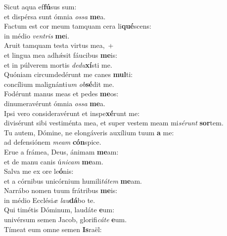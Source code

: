 \evenverse Sicut aqua ef\textbf{fú}sus sum:~\*\\
\evenverse et dispérsa sunt ómnia \textit{os}\textit{sa} \textbf{me}a.\\
\oddverse Factum est cor meum tamquam cera li\textbf{qué}scens:~\*\\
\oddverse in médio \textit{ven}\textit{tris} \textbf{me}i.\\
\evenverse Aruit tamquam testa virtus mea,~+\\
\evenverse  et lingua mea adhǽsit fáucibus \textbf{me}is:~\*\\
\evenverse et in púlverem mortis \textit{de}\textit{du}\textbf{xí}sti me.\\
\oddverse Quóniam circumdedérunt me canes \textbf{mul}ti:~\*\\
\oddverse concílium malignánti\textit{um} \textit{ob}\textbf{sé}dit me.\\
\evenverse Fodérunt manus meas et pedes \textbf{me}os:~\*\\
\evenverse dinumeravérunt ómnia \textit{os}\textit{sa} \textbf{me}a.\\
\oddverse Ipsi vero consideravérunt et inspe\textbf{xé}runt me:~\*\\
\oddverse divisérunt sibi vestiménta mea, et super vestem meam mi\textit{sé}\textit{runt} \textbf{sor}tem.\\
\evenverse Tu autem, Dómine, ne elongáveris auxílium tuum \textbf{a} me:~\*\\
\evenverse ad defensiónem \textit{me}\textit{am} \textbf{cón}spice.\\
\oddverse Erue a frámea, Deus, ánimam \textbf{me}am:~\*\\
\oddverse et de manu canis ú\textit{ni}\textit{cam} \textbf{me}am.\\
\evenverse Salva me ex ore le\textbf{ó}nis:~\*\\
\evenverse et a córnibus unicórnium humili\textit{tá}\textit{tem} \textbf{me}am.\\
\oddverse Narrábo nomen tuum frátribus \textbf{me}is:~\*\\
\oddverse in médio Ecclési\textit{æ} \textit{lau}\textbf{dá}bo te.\\
\evenverse Qui timétis Dóminum, laudáte \textbf{e}um:~\*\\
\evenverse univérsum semen Jacob, glorifi\textit{cá}\textit{te} \textbf{e}um.\\
\oddverse Tímeat eum omne semen \textbf{Is}raël:~\*\\
